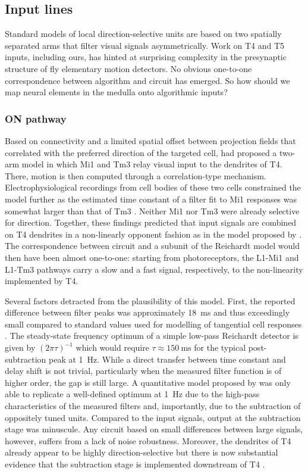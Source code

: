 \subsection{Input lines}
Standard models of local direction-selective units are based on two spatially separated arms that filter visual signals asymmetrically. Work on T4 and T5 inputs, including ours, has hinted at surprising complexity in the presynaptic structure of fly elementary motion detectors. No obvious one-to-one correspondence between algorithm and circuit has emerged. So how should we map neural elements in the medulla onto algorithmic inputs?


\subsubsection{ON pathway}
Based on connectivity and a limited spatial offset between projection fields that correlated with the preferred direction of the targeted cell, \citet{Takemura:2013ea} had proposed a two-arm model in which Mi1 and Tm3 relay visual input to the dendrites of T4. There, motion is then computed through a correlation-type mechanism. Electrophysiological recordings from cell bodies of these two cells constrained the model further as the estimated time constant of a filter fit to Mi1 responses was somewhat larger than that of Tm3 \citep{Behnia:2014jh}. Neither Mi1 nor Tm3 were already selective for direction. Together, these findings predicted that input signals are combined on T4 dendrites in a non-linearly opponent fashion as in the model proposed by \citet{Barlow:1965aa}. The correspondence between circuit and a subunit of the Reichardt model would then have been almost one-to-one: starting from photoreceptors, the L1-Mi1 and L1-Tm3 pathways carry a slow and a fast signal, respectively, to the non-linearity implemented by T4.

Several factors detracted from the plausibility of this model. First, the reported difference between filter peaks was approximately \SI{18}{\milli\second} and thus exceedingly small compared to standard values used for modelling of tangential cell responses \citep{Behnia:2014jh}. The steady-state frequency optimum of a simple low-pass Reichardt detector is given by $(2 \pi \tau)^{-1}$ which would require $\tau \approx \SI{150}{\milli\second}$ for the typical post-subtraction peak at \SI{1}{\hertz}. While a direct transfer between time constant and delay shift is not trivial, particularly when the measured filter function is of higher order, the gap is still large. A quantitative model proposed by \citet{Behnia:2014jh} was only able to replicate a well-defined optimum at \SI{1}{\hertz} due to the high-pass characteristics of the measured filters and, importantly, due to the subtraction of oppositely tuned units. Compared to the input signals, output at the subtraction stage was minuscule. Any circuit based on small differences between large signals, however, suffers from a lack of noise robustness. Moreover, the dendrites of T4 already appear to be highly direction-selective but there is now substantial evidence that the subtraction stage is implemented downstream of T4 \citep[see][and the sections below]{Mauss:2015kj}.

